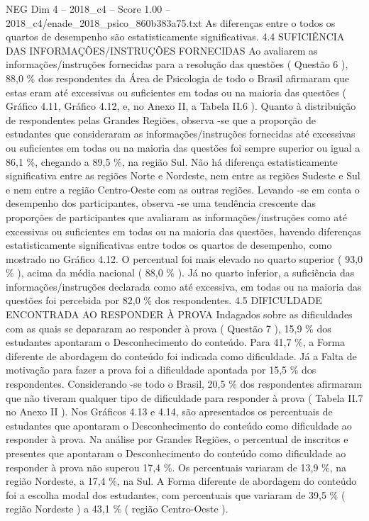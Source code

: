 \begin{textsample}{NEG Dim 4 – 2018\_c4 – Score 1.00 – 2018\_c4/enade\_2018\_psico\_860b383a75.txt}
As diferenças entre o todos os quartos de desempenho são estatisticamente significativas. 4.4 SUFICIÊNCIA DAS INFORMAÇÕES/INSTRUÇÕES FORNECIDAS Ao avaliarem as informações/instruções fornecidas para a resolução das questões ( Questão 6 ), 88,0 \% dos respondentes da Área de Psicologia de todo o Brasil afirmaram que estas eram até excessivas ou suficientes em todas ou na maioria das questões ( Gráfico 4.11, Gráfico 4.12, e, no Anexo II, a Tabela II.6 ).
Quanto à distribuição de respondentes pelas Grandes Regiões, observa -se que a proporção de estudantes que consideraram as informações/instruções fornecidas até excessivas ou suficientes em todas ou na maioria das questões foi sempre superior ou igual a 86,1 \%, chegando a 89,5 \%, na região Sul.
Não há diferença estatisticamente significativa entre as regiões Norte e Nordeste, nem entre as regiões Sudeste e Sul e nem entre a região Centro-Oeste com as outras regiões.
Levando -se em conta o desempenho dos participantes, observa -se uma tendência crescente das proporções de participantes que avaliaram as informações/instruções como até excessivas ou suficientes em todas ou na maioria das questões, havendo diferenças estatisticamente significativas entre todos os quartos de desempenho, como mostrado no Gráfico 4.12.
O percentual foi mais elevado no quarto superior ( 93,0 \% ), acima da média nacional ( 88,0 \% ).
Já no quarto inferior, a suficiência das informações/instruções declarada como até excessiva, em todas ou na maioria das questões foi percebida por 82,0 \% dos respondentes. 4.5 DIFICULDADE ENCONTRADA AO RESPONDER À PROVA Indagados sobre as dificuldades com as quais se depararam ao responder à prova ( Questão 7 ), 15,9 \% dos estudantes apontaram o Desconhecimento do conteúdo.
Para 41,7 \%, a Forma diferente de abordagem do conteúdo foi indicada como dificuldade.
Já a Falta de motivação para fazer a prova foi a dificuldade apontada por 15,5 \% dos respondentes.
Considerando -se todo o Brasil, 20,5 \% dos respondentes afirmaram que não tiveram qualquer tipo de dificuldade para responder à prova ( Tabela II.7 no Anexo II ).
Nos Gráficos 4.13 e 4.14, são apresentados os percentuais de estudantes que apontaram o Desconhecimento do conteúdo como dificuldade ao responder à prova.
Na análise por Grandes Regiões, o percentual de inscritos e presentes que apontaram o Desconhecimento do conteúdo como dificuldade ao responder à prova não superou 17,4 \%.
Os percentuais variaram de 13,9 \%, na região Nordeste, a 17,4 \%, na Sul.
A Forma diferente de abordagem do conteúdo foi a escolha modal dos estudantes, com percentuais que variaram de 39,5 \% ( região Nordeste ) a 43,1 \% ( região Centro-Oeste ).

\end{textsample}
